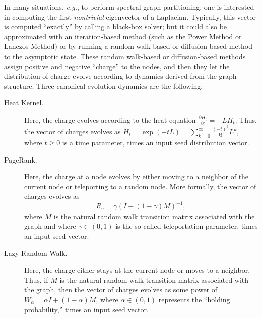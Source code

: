 \documentclass[12pt]{article}
\theoremstyle{plain}
\begin{document}
\vspace{-1mm}
In many situations, \emph{e.g.}, to perform spectral graph partitioning, 
one is interested in computing the first \emph{nontrivial} eigenvector of 
a Laplacian.
Typically, this vector is computed ``exactly'' by calling a black-box 
solver; but it could also be approximated with an iteration-based method 
(such as the Power Method or Lanczos Method) or by running a random 
walk-based or diffusion-based method to the asymptotic state.
These random walk-based or diffusion-based methods assign positive and 
negative ``charge'' to the nodes, and then they let the distribution of 
charge evolve according to dynamics derived from the graph structure.
Three canonical evolution dynamics are the following:
\begin{description}
  \item[Heat Kernel.]
    Here, the charge evolves according to the 
    heat equation
    $\frac{\partial H_t}{\partial t} = - L H_t$.
    Thus, the vector of charges evolves as
$     H_t = \exp ( -tL )  = \sum_{k=0}^{\infty} \frac{(-t)^k}{k!}L^k  $,
    where $t \ge 0$ is a time parameter, times an input seed distribution vector.
  \item[PageRank.]
    Here, the charge at a node evolves by either moving to a neighbor of 
    the current node or teleporting to a random node.
    More formally, the vector of charges evolves as 
    \begin{equation}
    \label{eqn:page-rank}
    R_{\gamma} = \gamma \left(I-\left(1-\gamma \right)M \right)^{-1}   ,
    \end{equation}
    where $M$ is the natural random walk transition matrix associated 
    with the graph and
    where $\gamma \in (0,1)$ is the so-called teleportation parameter,
    times an input seed vector.
  \item[Lazy Random Walk.]
    Here, the charge either stays at the current node or moves to a neighbor.
    Thus, if $M$ is the natural random walk transition matrix associated 
    with the graph, then the vector of charges evolves as some power of 
$     W_{\alpha}= \alpha I + (1-\alpha)M $,
    where $\alpha \in (0,1)$ represents the ``holding probability,'' times 
    an input seed vector.
\end{description}
\end{document}
